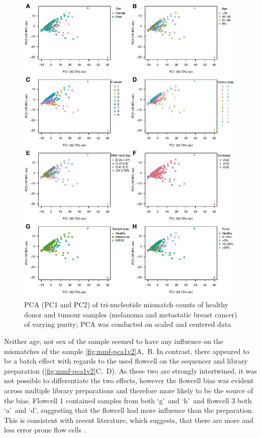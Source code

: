 \begin{figure}[htp]
\centering
\includegraphics[width=.99\linewidth]{Figures/MisMatchFinder/countPCAsPC1vsPC2.pdf}
\caption[PCA of tri-nucleotide mismatch counts of real world data (PC1 and PC2)]{PCA (PC1 and PC2) of tri-nucleotide mismatch counts of healthy donor and tumour samples (melanoma and metastatic breast cancer) of varying purity; PCA was conducted on scaled and centered data}\label{fig:mmf-pca1v2}
\end{figure}


Neither age, nor sex of the sample seemed to have any influence on the mismatches of the sample \autoref{fig:mmf-pca1v2}A,~B. In contrast, there appeared to be a batch effect with regards to the used flowcell on the sequencer and library preparation (\autoref{fig:mmf-pca1v2}C,~D). As these two are strongly intertwined, it was not possible to differentiate the two effects, however the flowcell bias was evident across multiple library preparations and therefore more likely to be the source of the bias. Flowcell 1 contained samples from both \lq g\rq\ and \lq h\rq\ and  flowcell 3 both \lq a\rq\ and \lq d\rq, suggesting that the flowcell had more influence than the preparation. This is consistent with recent literature, which suggests, that there are more and less error prone flow cells \cite{Stoler2021}.

